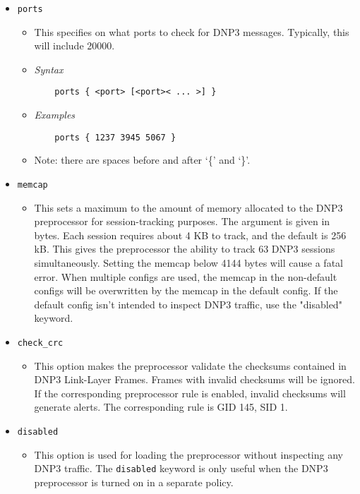 \documentclass[english]{report}
\begin{document}
\begin{itemize}
\item[] \texttt{ports}
\begin{itemize}
\item[]  This specifies on what ports to check for DNP3 messages. Typically, 
     this will include 20000.
\item[] \textit{Syntax}
\begin{verbatim}
    ports { <port> [<port>< ... >] }
\end{verbatim}
\item[] \textit{Examples}
\begin{verbatim}
    ports { 1237 3945 5067 }
\end{verbatim}
\item[] Note: there are spaces before and after `\{' and `\}'.
\end{itemize}

\item[] \texttt{memcap}
\begin{itemize}
\item[]  This sets a maximum to the amount of memory allocated to the DNP3
     preprocessor for session-tracking purposes. The argument is given
     in bytes.
     Each session requires about 4 KB to track, and the default is 256 kB.
     This gives the preprocessor the ability to track 63 DNP3 sessions
     simultaneously.
     Setting the memcap below 4144 bytes will cause a fatal error.
     When multiple configs are used, the memcap in the non-default configs
     will be overwritten by the memcap in the default config. If the default
     config isn't intended to inspect DNP3 traffic, use the "disabled"
     keyword.
\end{itemize}

\item[] \texttt{check\_crc}
\begin{itemize}
\item[]  This option makes the preprocessor validate the checksums contained in
     DNP3 Link-Layer Frames. Frames with invalid checksums will be ignored.
     If the corresponding preprocessor rule is enabled, invalid checksums
     will generate alerts.
     The corresponding rule is GID 145, SID 1.
\end{itemize}

\item[] \texttt{disabled}
\begin{itemize}
\item[]  This option is used for loading the preprocessor without inspecting
     any DNP3 traffic. The \texttt{disabled} keyword is only useful when the DNP3
     preprocessor is turned on in a separate policy.
\end{itemize}
\end{itemize}
\normalsize
\end{document}

